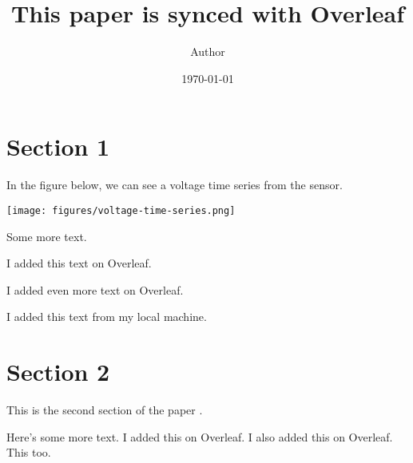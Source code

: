 \documentclass[11pt]{article}
\title{This paper is synced with Overleaf}
\author{ Author }
\date{\today}
\begin{document}
\maketitle
\pagebreak



\section{Section 1}

In the figure below,
we can see a voltage time series from the sensor.

\texttt{[image: figures/voltage-time-series.png]}

Some more text.

I added this text on Overleaf.

I added even more text on Overleaf.

I added this text from my local machine.

\pagebreak
\section{Section 2}

This is the second section of the paper \cite{AbramowitzStegun1970}.

Here's some more text.
I added this on Overleaf.
I also added this on Overleaf.
This too.




\end{document}
